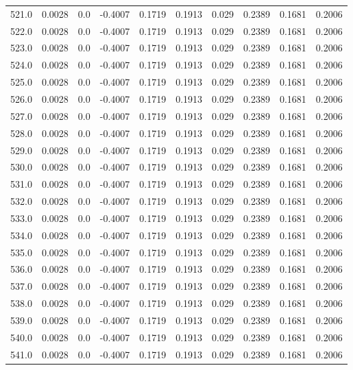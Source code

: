 \begin{longtable}{lrrrrrrrrr}
521.0 & 0.0028 & 0.0 & -0.4007 & 0.1719 & 0.1913 & 0.029 & 0.2389 & 0.1681 & 0.2006 \\
522.0 & 0.0028 & 0.0 & -0.4007 & 0.1719 & 0.1913 & 0.029 & 0.2389 & 0.1681 & 0.2006 \\
523.0 & 0.0028 & 0.0 & -0.4007 & 0.1719 & 0.1913 & 0.029 & 0.2389 & 0.1681 & 0.2006 \\
524.0 & 0.0028 & 0.0 & -0.4007 & 0.1719 & 0.1913 & 0.029 & 0.2389 & 0.1681 & 0.2006 \\
525.0 & 0.0028 & 0.0 & -0.4007 & 0.1719 & 0.1913 & 0.029 & 0.2389 & 0.1681 & 0.2006 \\
526.0 & 0.0028 & 0.0 & -0.4007 & 0.1719 & 0.1913 & 0.029 & 0.2389 & 0.1681 & 0.2006 \\
527.0 & 0.0028 & 0.0 & -0.4007 & 0.1719 & 0.1913 & 0.029 & 0.2389 & 0.1681 & 0.2006 \\
528.0 & 0.0028 & 0.0 & -0.4007 & 0.1719 & 0.1913 & 0.029 & 0.2389 & 0.1681 & 0.2006 \\
529.0 & 0.0028 & 0.0 & -0.4007 & 0.1719 & 0.1913 & 0.029 & 0.2389 & 0.1681 & 0.2006 \\
530.0 & 0.0028 & 0.0 & -0.4007 & 0.1719 & 0.1913 & 0.029 & 0.2389 & 0.1681 & 0.2006 \\
531.0 & 0.0028 & 0.0 & -0.4007 & 0.1719 & 0.1913 & 0.029 & 0.2389 & 0.1681 & 0.2006 \\
532.0 & 0.0028 & 0.0 & -0.4007 & 0.1719 & 0.1913 & 0.029 & 0.2389 & 0.1681 & 0.2006 \\
533.0 & 0.0028 & 0.0 & -0.4007 & 0.1719 & 0.1913 & 0.029 & 0.2389 & 0.1681 & 0.2006 \\
534.0 & 0.0028 & 0.0 & -0.4007 & 0.1719 & 0.1913 & 0.029 & 0.2389 & 0.1681 & 0.2006 \\
535.0 & 0.0028 & 0.0 & -0.4007 & 0.1719 & 0.1913 & 0.029 & 0.2389 & 0.1681 & 0.2006 \\
536.0 & 0.0028 & 0.0 & -0.4007 & 0.1719 & 0.1913 & 0.029 & 0.2389 & 0.1681 & 0.2006 \\
537.0 & 0.0028 & 0.0 & -0.4007 & 0.1719 & 0.1913 & 0.029 & 0.2389 & 0.1681 & 0.2006 \\
538.0 & 0.0028 & 0.0 & -0.4007 & 0.1719 & 0.1913 & 0.029 & 0.2389 & 0.1681 & 0.2006 \\
539.0 & 0.0028 & 0.0 & -0.4007 & 0.1719 & 0.1913 & 0.029 & 0.2389 & 0.1681 & 0.2006 \\
540.0 & 0.0028 & 0.0 & -0.4007 & 0.1719 & 0.1913 & 0.029 & 0.2389 & 0.1681 & 0.2006 \\
541.0 & 0.0028 & 0.0 & -0.4007 & 0.1719 & 0.1913 & 0.029 & 0.2389 & 0.1681 & 0.2006 \\

\end{longtable}
